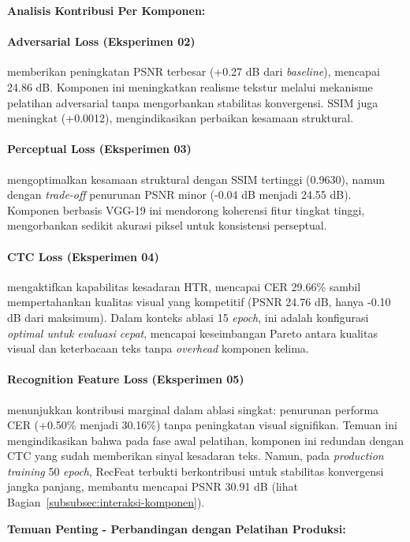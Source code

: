 \documentclass[12pt,a4paper]{article}
\begin{document}
\textbf{Analisis Kontribusi Per Komponen:}

\paragraph{Adversarial Loss (Eksperimen 02)} memberikan peningkatan PSNR terbesar (+0.27 dB dari \textit{baseline}), mencapai 24.86 dB. Komponen ini meningkatkan realisme tekstur melalui mekanisme \textnormal{pelatihan adversarial} tanpa mengorbankan stabilitas konvergensi. SSIM juga meningkat (+0.0012), mengindikasikan perbaikan kesamaan struktural.

\paragraph{Perceptual Loss (Eksperimen 03)} mengoptimalkan kesamaan struktural dengan SSIM tertinggi (0.9630), namun dengan \textit{trade-off} penurunan PSNR minor (-0.04 dB menjadi 24.55 dB). Komponen berbasis VGG-19 ini mendorong koherensi fitur tingkat tinggi, mengorbankan sedikit akurasi piksel untuk konsistensi perseptual.

\paragraph{CTC Loss (Eksperimen 04)} mengaktifkan kapabilitas kesadaran HTR, mencapai CER 29.66\% sambil mempertahankan kualitas visual yang kompetitif (PSNR 24.76 dB, hanya -0.10 dB dari maksimum). Dalam konteks ablasi 15 \textit{epoch}, ini adalah konfigurasi \textit{optimal untuk evaluasi cepat}, mencapai keseimbangan Pareto antara kualitas visual dan keterbacaan teks tanpa \textit{overhead} komponen kelima.

\paragraph{Recognition Feature Loss (Eksperimen 05)} menunjukkan kontribusi marginal dalam ablasi singkat: penurunan performa CER (+0.50\% menjadi 30.16\%) tanpa peningkatan visual signifikan. Temuan ini mengindikasikan bahwa pada fase awal pelatihan, komponen ini redundan dengan CTC yang sudah memberikan sinyal kesadaran teks. Namun, pada \textit{production training} 50 \textit{epoch}, RecFeat terbukti berkontribusi untuk stabilitas konvergensi jangka panjang, membantu mencapai PSNR 30.91 dB (lihat Bagian~\ref{subsubsec:interaksi-komponen}).

\textbf{Temuan Penting - Perbandingan dengan Pelatihan Produksi:}
\end{document}
